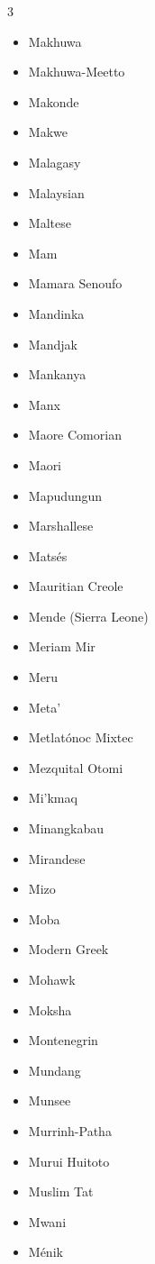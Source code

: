 \documentclass[paper=a4, 10pt]{scrbook}
\begin{document}
\begin{multicols}{3}
\begin{itemize}
        \item Makhuwa
        \item Makhuwa-Meetto
        \item Makonde
        \item Makwe
        \item Malagasy
        \item Malaysian
        \item Maltese
        \item Mam
        \item Mamara Senoufo
        \item Mandinka
        \item Mandjak
        \item Mankanya
        \item Manx
        \item Maore Comorian
        \item Maori
        \item Mapudungun
        \item Marshallese
        \item Matsés
        \item Mauritian Creole
        \item Mende (Sierra Leone)
        \item Meriam Mir
        \item Meru
        \item Meta’
        \item Metlatónoc Mixtec
        \item Mezquital Otomi
        \item Mi’kmaq
        \item Minangkabau
        \item Mirandese
        \item Mizo
        \item Moba
        \item Modern Greek
        \item Mohawk
        \item Moksha
        \item Montenegrin
        \item Mundang
        \item Munsee
        \item Murrinh-Patha
        \item Murui Huitoto
        \item Muslim Tat
        \item Mwani
        \item Ménik

\end{itemize}
\end{multicols}
\end{document}
